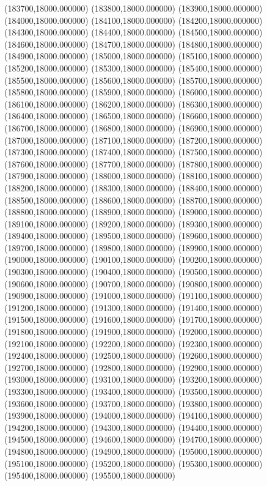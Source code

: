 (183700,18000.000000)
(183800,18000.000000)
(183900,18000.000000)
(184000,18000.000000)
(184100,18000.000000)
(184200,18000.000000)
(184300,18000.000000)
(184400,18000.000000)
(184500,18000.000000)
(184600,18000.000000)
(184700,18000.000000)
(184800,18000.000000)
(184900,18000.000000)
(185000,18000.000000)
(185100,18000.000000)
(185200,18000.000000)
(185300,18000.000000)
(185400,18000.000000)
(185500,18000.000000)
(185600,18000.000000)
(185700,18000.000000)
(185800,18000.000000)
(185900,18000.000000)
(186000,18000.000000)
(186100,18000.000000)
(186200,18000.000000)
(186300,18000.000000)
(186400,18000.000000)
(186500,18000.000000)
(186600,18000.000000)
(186700,18000.000000)
(186800,18000.000000)
(186900,18000.000000)
(187000,18000.000000)
(187100,18000.000000)
(187200,18000.000000)
(187300,18000.000000)
(187400,18000.000000)
(187500,18000.000000)
(187600,18000.000000)
(187700,18000.000000)
(187800,18000.000000)
(187900,18000.000000)
(188000,18000.000000)
(188100,18000.000000)
(188200,18000.000000)
(188300,18000.000000)
(188400,18000.000000)
(188500,18000.000000)
(188600,18000.000000)
(188700,18000.000000)
(188800,18000.000000)
(188900,18000.000000)
(189000,18000.000000)
(189100,18000.000000)
(189200,18000.000000)
(189300,18000.000000)
(189400,18000.000000)
(189500,18000.000000)
(189600,18000.000000)
(189700,18000.000000)
(189800,18000.000000)
(189900,18000.000000)
(190000,18000.000000)
(190100,18000.000000)
(190200,18000.000000)
(190300,18000.000000)
(190400,18000.000000)
(190500,18000.000000)
(190600,18000.000000)
(190700,18000.000000)
(190800,18000.000000)
(190900,18000.000000)
(191000,18000.000000)
(191100,18000.000000)
(191200,18000.000000)
(191300,18000.000000)
(191400,18000.000000)
(191500,18000.000000)
(191600,18000.000000)
(191700,18000.000000)
(191800,18000.000000)
(191900,18000.000000)
(192000,18000.000000)
(192100,18000.000000)
(192200,18000.000000)
(192300,18000.000000)
(192400,18000.000000)
(192500,18000.000000)
(192600,18000.000000)
(192700,18000.000000)
(192800,18000.000000)
(192900,18000.000000)
(193000,18000.000000)
(193100,18000.000000)
(193200,18000.000000)
(193300,18000.000000)
(193400,18000.000000)
(193500,18000.000000)
(193600,18000.000000)
(193700,18000.000000)
(193800,18000.000000)
(193900,18000.000000)
(194000,18000.000000)
(194100,18000.000000)
(194200,18000.000000)
(194300,18000.000000)
(194400,18000.000000)
(194500,18000.000000)
(194600,18000.000000)
(194700,18000.000000)
(194800,18000.000000)
(194900,18000.000000)
(195000,18000.000000)
(195100,18000.000000)
(195200,18000.000000)
(195300,18000.000000)
(195400,18000.000000)
(195500,18000.000000)
